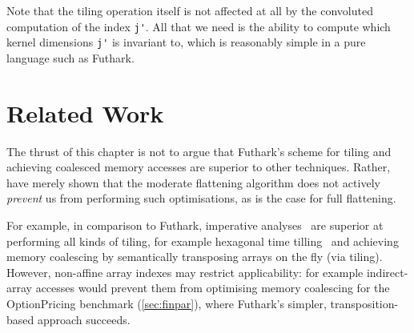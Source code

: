 Note that the tiling operation itself is not affected at all by the
convoluted computation of the index \lstinline{j'}.  All that we need
is the ability to compute which kernel dimensions \lstinline{j'} is
invariant to, which is reasonably simple in a pure language such as
Futhark.

\section{Related Work}

The thrust of this chapter is not to argue that Futhark's scheme for
tiling and achieving coalesced memory accesses are superior to other
techniques.  Rather, have merely shown that the moderate flattening
algorithm does not actively \textit{prevent} us from performing such
optimisations, as is the case for full flattening.

For example, in comparison to Futhark, imperative
analyses~\cite{InformalTiling,PolyPluto2} are superior at performing
all kinds of tiling, for example hexagonal time
tilling~\cite{HexaTiling} and achieving memory coalescing by
semantically transposing arrays on the fly (via tiling).
%
However, non-affine array indexes may restrict applicability: for
example indirect-array accesses would prevent them from optimising
memory coalescing for the OptionPricing benchmark (\cref{sec:finpar}),
where Futhark's simpler, transposition-based approach succeeds.

